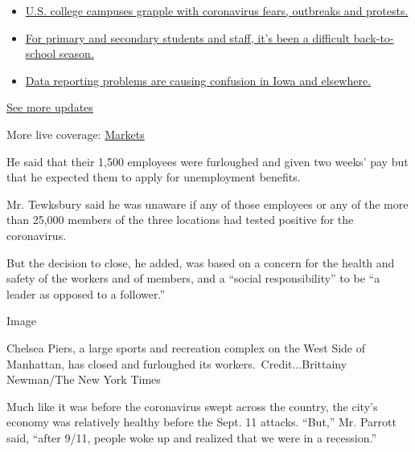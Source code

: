 \begin{itemize}
\tightlist
\item
  \href{https://www.nytimes3xbfgragh.onion/2020/08/17/world/coronavirus-covid.html?action=click\&pgtype=Article\&state=default\&region=MAIN_CONTENT_1\&context=storylines_live_updates\#link-6fdbc8ef}{U.S.
  college campuses grapple with coronavirus fears, outbreaks and
  protests.}
\item
  \href{https://www.nytimes3xbfgragh.onion/2020/08/17/world/coronavirus-covid.html?action=click\&pgtype=Article\&state=default\&region=MAIN_CONTENT_1\&context=storylines_live_updates\#link-12d68713}{For
  primary and secondary students and staff, it's been a difficult
  back-to-school season.}
\item
  \href{https://www.nytimes3xbfgragh.onion/2020/08/17/world/coronavirus-covid.html?action=click\&pgtype=Article\&state=default\&region=MAIN_CONTENT_1\&context=storylines_live_updates\#link-6aa8318c}{Data
  reporting problems are causing confusion in Iowa and elsewhere.}
\end{itemize}

\href{https://www.nytimes3xbfgragh.onion/2020/08/17/world/coronavirus-covid.html?action=click\&pgtype=Article\&state=default\&region=MAIN_CONTENT_1\&context=storylines_live_updates}{See
more updates}

More live coverage:
\href{https://www.nytimes3xbfgragh.onion/live/2020/08/17/business/stock-market-today-coronavirus?action=click\&pgtype=Article\&state=default\&region=MAIN_CONTENT_1\&context=storylines_live_updates}{Markets}

He said that their 1,500 employees were furloughed and given two weeks'
pay but that he expected them to apply for unemployment benefits.

Mr. Tewksbury said he was unaware if any of those employees or any of
the more than 25,000 members of the three locations had tested positive
for the coronavirus.

But the decision to close, he added, was based on a concern for the
health and safety of the workers and of members, and a ``social
responsibility'' to be ``a leader as opposed to a follower.''

Image

Chelsea Piers, a large sports and recreation complex on the West Side of
Manhattan, has closed and furloughed its workers.~Credit...Brittainy
Newman/The New York Times

Much like it was before the coronavirus swept across the country, the
city's economy was relatively healthy before the Sept. 11 attacks.
``But,'' Mr. Parrott said, ``after 9/11, people woke up and realized
that we were in a recession.''

